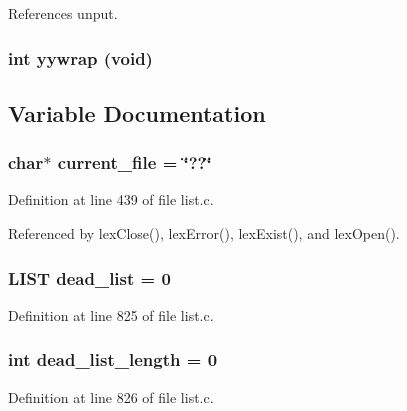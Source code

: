 References unput.
\subsubsection{\setlength{\rightskip}{0pt plus 5cm}int yywrap (void)}\label{list_8c_9ae7dd87893ed6cebc02d0d5f84c2ede}




\subsection{Variable Documentation}
\subsubsection{\setlength{\rightskip}{0pt plus 5cm}char$\ast$ \bf{current\_\-file} = \char`\"{}??\char`\"{}\hspace{0.3cm}{\tt  [static]}}\label{list_8c_f6dfd479b7e5d3e23f4813dd488fe43b}




Definition at line 439 of file list.c.

Referenced by lex\-Close(), lex\-Error(), lex\-Exist(), and lex\-Open().
\subsubsection{\setlength{\rightskip}{0pt plus 5cm}\bf{LIST} \bf{dead\_\-list} = 0\hspace{0.3cm}{\tt  [static]}}\label{list_8c_ef78b18d84652dec932b6e7dfed4708b}




Definition at line 825 of file list.c.
\subsubsection{\setlength{\rightskip}{0pt plus 5cm}int \bf{dead\_\-list\_\-length} = 0\hspace{0.3cm}{\tt  [static]}}\label{list_8c_ea6824d55afb12532be8a47236e7b05f}




Definition at line 826 of file list.c.
